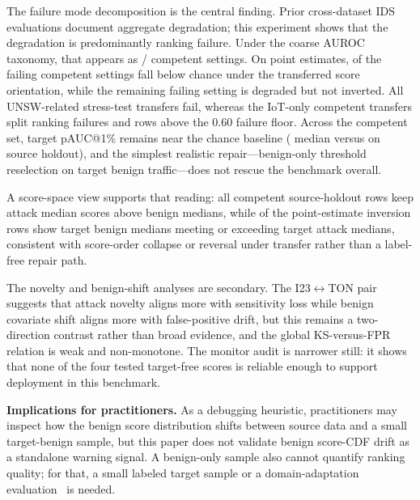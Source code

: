 \documentclass[10pt,conference]{IEEEtran}
\begin{document}
The failure mode decomposition is the central finding. Prior cross-dataset IDS evaluations document aggregate degradation; this experiment shows that the degradation is predominantly ranking failure. Under the coarse AUROC taxonomy, that appears as \CompetentRankingFailureCount{}/\CompetentSettingCount{} competent settings. On point estimates, \CompetentInversionCount{} of the failing competent settings fall below chance under the transferred score orientation, while the remaining failing setting is degraded but not inverted. All \CompetentUnswStressTestSettingCount{} UNSW-related stress-test transfers fail, whereas the \CompetentIotOnlySettingCount{} IoT-only competent transfers split \CompetentIotOnlyRankingFailureCount{} ranking failures and \CompetentIotOnlyNonCollapsedCount{} rows above the 0.60 failure floor. Across the competent set, target pAUC@1\% remains near the chance baseline (\CompetentTargetPaucMedian{} median versus \CompetentSourcePaucMedian{} on source holdout), and the simplest realistic repair---benign-only threshold reselection on target benign traffic---does not rescue the benchmark overall.

A score-space view supports that reading: all \CompetentSourcePositiveMedianGapCount{} competent source-holdout rows keep attack median scores above benign medians, while \CompetentInversionMedianCrossoverCount{} of the \CompetentInversionCount{} point-estimate inversion rows show target benign medians meeting or exceeding target attack medians, consistent with score-order collapse or reversal under transfer rather than a label-free repair path.

The novelty and benign-shift analyses are secondary. The I23$\leftrightarrow$TON pair suggests that attack novelty aligns more with sensitivity loss while benign covariate shift aligns more with false-positive drift, but this remains a two-direction contrast rather than broad evidence, and the global KS-versus-FPR relation is weak and non-monotone. The monitor audit is narrower still: it shows that none of the four tested target-free scores is reliable enough to support deployment in this benchmark.

\textbf{Implications for practitioners.} As a debugging heuristic, practitioners may inspect how the benign score distribution shifts between source data and a small target-benign sample, but this paper does not validate benign score-CDF drift as a standalone warning signal. A benign-only sample also cannot quantify ranking quality; for that, a small labeled target sample or a domain-adaptation evaluation~\cite{dinids2021,sun2016return} is needed.
\end{document}
